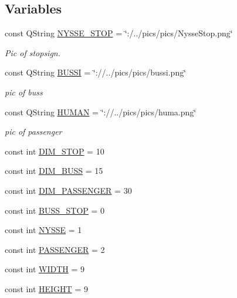 \subsection*{Variables}
\begin{DoxyCompactItemize}
\item 
const Q\-String \hyperlink{actoritem_8hh_aa4b129297bf7c3a2ab33895c4ec37ade}{N\-Y\-S\-S\-E\-\_\-\-S\-T\-O\-P} = \char`\"{}\-:/../pics/pics/Nysse\-Stop.\-png\char`\"{}
\begin{DoxyCompactList}\small\item\em Pic of stopsign. \end{DoxyCompactList}\item 
const Q\-String \hyperlink{actoritem_8hh_aedf8524adc61b4d09d86db4fa2f207d2}{B\-U\-S\-S\-I} = \char`\"{}\-://../pics/pics/bussi.\-png\char`\"{}
\begin{DoxyCompactList}\small\item\em pic of buss \end{DoxyCompactList}\item 
const Q\-String \hyperlink{actoritem_8hh_a919ee1b297d205cded0f0dc03ade1cfd}{H\-U\-M\-A\-N} = \char`\"{}\-://../pics/pics/huma.\-png\char`\"{}
\begin{DoxyCompactList}\small\item\em pic of passenger \end{DoxyCompactList}\item 
const int \hyperlink{actoritem_8hh_abd028a1a48c574e726a4a904fff0a08c}{D\-I\-M\-\_\-\-S\-T\-O\-P} = 10
\item 
const int \hyperlink{actoritem_8hh_a0206546ca28fb9fca0c00861c5843dd5}{D\-I\-M\-\_\-\-B\-U\-S\-S} = 15
\item 
const int \hyperlink{actoritem_8hh_a94bb4115dc75d86789f2424ba4efcbdc}{D\-I\-M\-\_\-\-P\-A\-S\-S\-E\-N\-G\-E\-R} = 30
\item 
const int \hyperlink{actoritem_8hh_a65e7f70d9c573d5bfd13804a406fc067}{B\-U\-S\-S\-\_\-\-S\-T\-O\-P} = 0
\item 
const int \hyperlink{actoritem_8hh_a184d5b62435541e060c4dd4f179bec92}{N\-Y\-S\-S\-E} = 1
\item 
const int \hyperlink{actoritem_8hh_ad93711fcc7685c6b7a6530eda7984a55}{P\-A\-S\-S\-E\-N\-G\-E\-R} = 2
\item 
const int \hyperlink{actoritem_8hh_a9649ab8139c4c2ea5c93625b30d92a05}{W\-I\-D\-T\-H} = 9
\item 
const int \hyperlink{actoritem_8hh_af728b7647e0b8c49832983a31f9a2e9b}{H\-E\-I\-G\-H\-T} = 9
\end{DoxyCompactItemize}


